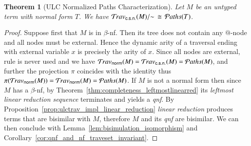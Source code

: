 \documentclass{elsarticle}
\theoremstyle{plain}
\newtheorem{theorem}{Theorem}[section]
\theoremstyle{definition}
\newcommand{\normalizing}{{\sf norm}}
\newcommand{\travsetnorm}{\travset_\normalizing} %
\newcommand{\travsetscn}{\travset_{\sf c.s.n.}} %
\def\structisomorphic{\cong} %
\def\coresymbol{\pi} %
\newcommand{\core}[1]{\coresymbol(#1)} %
\newcommand\pathset{{\mathcal{P}aths}} %
\begin{document}


\begin{theorem}[ULC Normalized Paths Characterization]
\label{thm:path_charact_ulc}
Let $M$ be an untyped term with normal form $T$. We have
$\travsetscn(M)/{\sim} \, \structisomorphic\, \pathset(T)$.
\end{theorem}
\begin{proof}
Suppose first that $M$ is in $\beta$-nf. Then its tree does not contain any $@$-node and all nodes must be external.
Hence the dynamic arity of a traversal ending with external variable $x$ is precisely the arity of $x$. Since all nodes are external,
rule  is never used and we have
$\travsetnorm(M) = \travsetscn(M) = \pathset(M)$, and further
the projection $\coresymbol$ coincides with the identity thus $\core{\travsetnorm(M)} = \travsetnorm(M) = \pathset(M)$.
%
If $M$ is not a normal form then since $M$ has a $\beta$-nf, by Theorem~\ref{thm:completeness_leftmostlinearred} its \emph{leftmost linear reduction sequence} terminates and yields a \emph{qnf}.
By Proposition~\ref{prop:ulctrav_impl_linear_reduction}
\emph{linear reduction} produces terms that are bisimilar with $M$,
therefore $M$ and its \emph{qnf} are bisimilar.
We can then conclude with Lemma~\ref{lem:bisimulation_isomorphism}
and Corollary~\ref{cor:qnf_and_nf_traveset_invariant}.
\end{proof}
\end{document}
